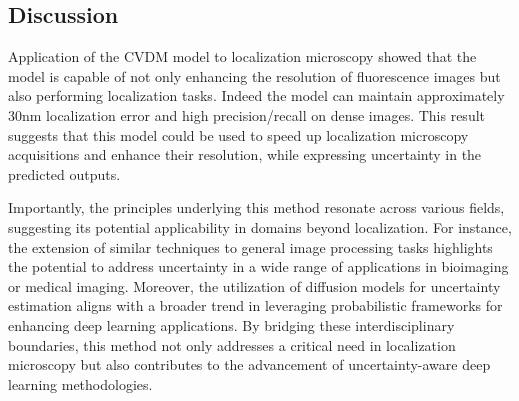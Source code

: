 

\subsection{Discussion}

Application of the CVDM model to localization microscopy showed that the model is capable of not only enhancing the resolution of fluorescence images but also performing localization tasks. Indeed the model can maintain approximately 30nm localization error and high precision/recall on dense images. This result suggests that this model could be used to speed up localization microscopy acquisitions and enhance their resolution, while expressing uncertainty in the predicted outputs. 

Importantly, the principles underlying this method resonate across various fields, suggesting its potential applicability in domains beyond localization. For instance, the extension of similar techniques to general image processing tasks highlights the potential to address uncertainty in a wide range of applications in bioimaging or medical imaging. Moreover, the utilization of diffusion models for uncertainty estimation aligns with a broader trend in leveraging probabilistic frameworks for enhancing deep learning applications. By bridging these interdisciplinary boundaries, this method not only addresses a critical need in localization microscopy but also contributes to the advancement of uncertainty-aware deep learning methodologies.


